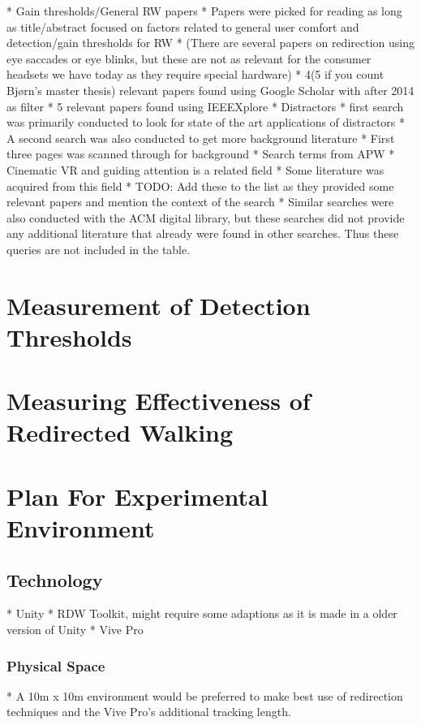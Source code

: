     * Gain thresholds/General RW papers
        * Papers were picked for reading as long as title/abstract focused on factors related to general user comfort and detection/gain thresholds for RW
        * (There are several papers on redirection using eye saccades or eye blinks, but these are not as relevant for the consumer headsets we have today as they require special hardware)
        * 4(5 if you count Bjørn's master thesis) relevant papers found using Google Scholar with after 2014 as filter
        * 5 relevant papers found using IEEEXplore
    * Distractors
       * first search was primarily conducted to look for state of the art applications of distractors
       * A second search was also conducted to get more background literature
          * First three pages was scanned through for background
    * Search terms from APW
       * Cinematic VR and guiding attention is a related field
       * Some literature was acquired from this field
       * TODO: Add these to the list as they provided some relevant papers and mention the context of the search
    * Similar searches were also conducted with the ACM digital library, but these searches did not provide any additional literature that already were found in other searches. Thus these queries are not included in the table.

\section{Measurement of Detection Thresholds}

\section{Measuring Effectiveness of Redirected Walking}

\section{Plan For Experimental Environment}
\subsection{Technology}
* Unity
   * RDW Toolkit, might require some adaptions as it is made in a older version of Unity
* Vive Pro
\subsubsection{Physical Space}
* A 10m x 10m environment would be preferred to make best use of redirection techniques and the Vive Pro's additional tracking length. 